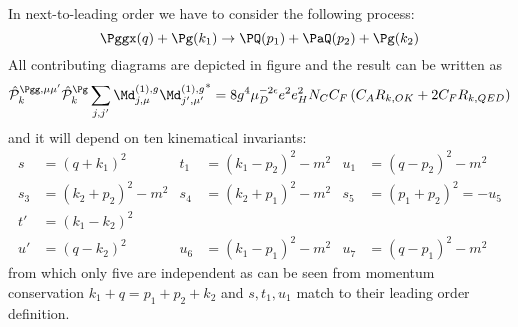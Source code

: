 \label{sec:NLO.g}
In next-to-leading order we have to consider the following process:
\begin{equation}
\Pggx(q) + \Pg(k_1) \rightarrow \PQ(p_1)+\PaQ(p_2) + \Pg(k_2)
\end{equation}
All contributing diagrams are depicted in figure  and the result can be written as
\begin{equation}
\hat {\mathcal P}_{k}^{\Pgg,\mu\mu'}\hat {\mathcal P}_{k}^{\Pg}\sum_{j,j'}{\Md^{(1),g}_{j,\mu}\Md^{(1),g}_{j',\mu'}}^* = 8g^4\mu_D^{-2\epsilon}e^2e_H^2 N_C C_F\left( C_A R_{k,OK} + 2C_F R_{k,QED}\right)
\end{equation}
and it will depend on ten kinematical invariants:
\begin{align}
s &= (q+k_1)^2 &t_1 &=(k_1-p_2)^2-m^2 &u_1 &=(q-p_2)^2 -m^2\\
s_3 &= (k_2+p_2)^2-m^2 &s_4 &=(k_2+p_1)^2-m^2 &s_5 &= (p_1+p_2)^2=-u_5\\
t' &= (k_1-k_2)^2\\
u' &= (q-k_2)^2 &u_6 &=(k_1-p_1)^2-m^2 &u_7 &=(q-p_1)^2-m^2
\end{align}
from which only five are independent as can be seen from momentum conservation $k_1+q=p_1+p_2+k_2$ and $s,t_1,u_1$ match to their leading order definition.

